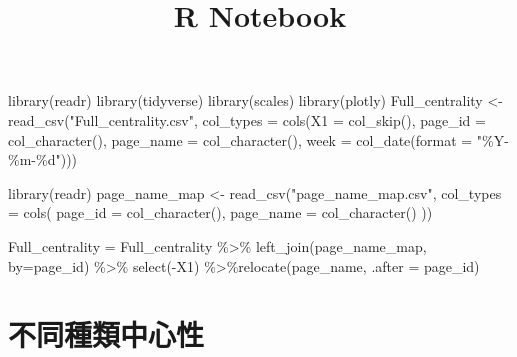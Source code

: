 \documentclass[
]{article}
\title{R Notebook}
\author{}
\date{\vspace{-2.5em}}
\newenvironment{Shaded}{\begin{snugshade}}{\end{snugshade}}
\newcommand{\AttributeTok}[1]{\textcolor[rgb]{0.77,0.63,0.00}{#1}}
\newcommand{\FunctionTok}[1]{\textcolor[rgb]{0.00,0.00,0.00}{#1}}
\newcommand{\NormalTok}[1]{#1}
\newcommand{\OtherTok}[1]{\textcolor[rgb]{0.56,0.35,0.01}{#1}}
\newcommand{\SpecialCharTok}[1]{\textcolor[rgb]{0.00,0.00,0.00}{#1}}
\newcommand{\StringTok}[1]{\textcolor[rgb]{0.31,0.60,0.02}{#1}}
\begin{document}
\maketitle

\begin{Shaded}
\begin{Highlighting}[]
\FunctionTok{library}\NormalTok{(readr)}
\FunctionTok{library}\NormalTok{(tidyverse)}
\FunctionTok{library}\NormalTok{(scales)}
\FunctionTok{library}\NormalTok{(plotly)}
\NormalTok{Full\_centrality }\OtherTok{\textless{}{-}} \FunctionTok{read\_csv}\NormalTok{(}\StringTok{"Full\_centrality.csv"}\NormalTok{, }
    \AttributeTok{col\_types =} \FunctionTok{cols}\NormalTok{(}\AttributeTok{X1 =} \FunctionTok{col\_skip}\NormalTok{(), }
                     \AttributeTok{page\_id =} \FunctionTok{col\_character}\NormalTok{(), }
                     \AttributeTok{page\_name =} \FunctionTok{col\_character}\NormalTok{(),}
                     \AttributeTok{week =} \FunctionTok{col\_date}\NormalTok{(}\AttributeTok{format =} \StringTok{"\%Y{-}\%m{-}\%d"}\NormalTok{)))}

\FunctionTok{library}\NormalTok{(readr)}
\NormalTok{page\_name\_map }\OtherTok{\textless{}{-}} \FunctionTok{read\_csv}\NormalTok{(}\StringTok{"page\_name\_map.csv"}\NormalTok{, }
                          \AttributeTok{col\_types =} \FunctionTok{cols}\NormalTok{(}
                            \AttributeTok{page\_id =} \FunctionTok{col\_character}\NormalTok{(), }
                            \AttributeTok{page\_name =} \FunctionTok{col\_character}\NormalTok{()}
\NormalTok{                          ))}


\NormalTok{Full\_centrality }\OtherTok{=}\NormalTok{ Full\_centrality }\SpecialCharTok{\%\textgreater{}\%} \FunctionTok{left\_join}\NormalTok{(page\_name\_map, }\AttributeTok{by=}\StringTok{\textquotesingle{}page\_id\textquotesingle{}}\NormalTok{) }\SpecialCharTok{\%\textgreater{}\%} \FunctionTok{select}\NormalTok{(}\SpecialCharTok{{-}}\NormalTok{X1) }\SpecialCharTok{\%\textgreater{}\%}\FunctionTok{relocate}\NormalTok{(page\_name, }\AttributeTok{.after =}\NormalTok{ page\_id) }
\end{Highlighting}
\end{Shaded}

\hypertarget{ux4e0dux540cux7a2eux985eux4e2dux5fc3ux6027}{%
\section{不同種類中心性}\label{ux4e0dux540cux7a2eux985eux4e2dux5fc3ux6027}}
\end{document}
